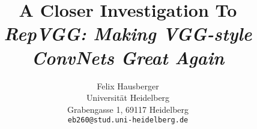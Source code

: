 \documentclass[final]{cvpr}
\begin{document}
\title{A Closer Investigation To \\ \textit{RepVGG: Making VGG-style ConvNets Great Again}}

\author{Felix Hausberger\\
	Universität Heidelberg\\
	Grabengasse 1, 69117 Heidelberg\\
	{\tt\small eb260@stud.uni-heidelberg.de}
}

\maketitle






















{\small


}
\end{document}
